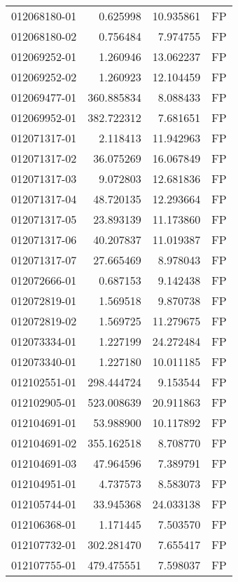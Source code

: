 \begin{tabular}{lrrl}
012068180-01 &    0.625998 &      10.935861 &   FP \\
012068180-02 &    0.756484 &       7.974755 &   FP \\
012069252-01 &    1.260946 &      13.062237 &   FP \\
012069252-02 &    1.260923 &      12.104459 &   FP \\
012069477-01 &  360.885834 &       8.088433 &   FP \\
012069952-01 &  382.722312 &       7.681651 &   FP \\
012071317-01 &    2.118413 &      11.942963 &   FP \\
012071317-02 &   36.075269 &      16.067849 &   FP \\
012071317-03 &    9.072803 &      12.681836 &   FP \\
012071317-04 &   48.720135 &      12.293664 &   FP \\
012071317-05 &   23.893139 &      11.173860 &   FP \\
012071317-06 &   40.207837 &      11.019387 &   FP \\
012071317-07 &   27.665469 &       8.978043 &   FP \\
012072666-01 &    0.687153 &       9.142438 &   FP \\
012072819-01 &    1.569518 &       9.870738 &   FP \\
012072819-02 &    1.569725 &      11.279675 &   FP \\
012073334-01 &    1.227199 &      24.272484 &   FP \\
012073340-01 &    1.227180 &      10.011185 &   FP \\
012102551-01 &  298.444724 &       9.153544 &   FP \\
012102905-01 &  523.008639 &      20.911863 &   FP \\
012104691-01 &   53.988900 &      10.117892 &   FP \\
012104691-02 &  355.162518 &       8.708770 &   FP \\
012104691-03 &   47.964596 &       7.389791 &   FP \\
012104951-01 &    4.737573 &       8.583073 &   FP \\
012105744-01 &   33.945368 &      24.033138 &   FP \\
012106368-01 &    1.171445 &       7.503570 &   FP \\
012107732-01 &  302.281470 &       7.655417 &   FP \\
012107755-01 &  479.475551 &       7.598037 &   FP \\

\end{tabular}
